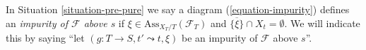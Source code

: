 \begin{definition}
\label{definition-impurity}
In
Situation \ref{situation-pre-pure}
we say a diagram (\ref{equation-impurity}) defines an
{\it impurity of $\mathcal{F}$ above $s$}
if $\xi \in \text{Ass}_{X_T/T}(\mathcal{F}_T)$ and
$\overline{\{\xi\}} \cap X_t = \emptyset$. We will indicate
this by saying ``let $(g : T \to S, t' \leadsto t, \xi)$ be
an impurity of $\mathcal{F}$ above $s$''.
\end{definition}